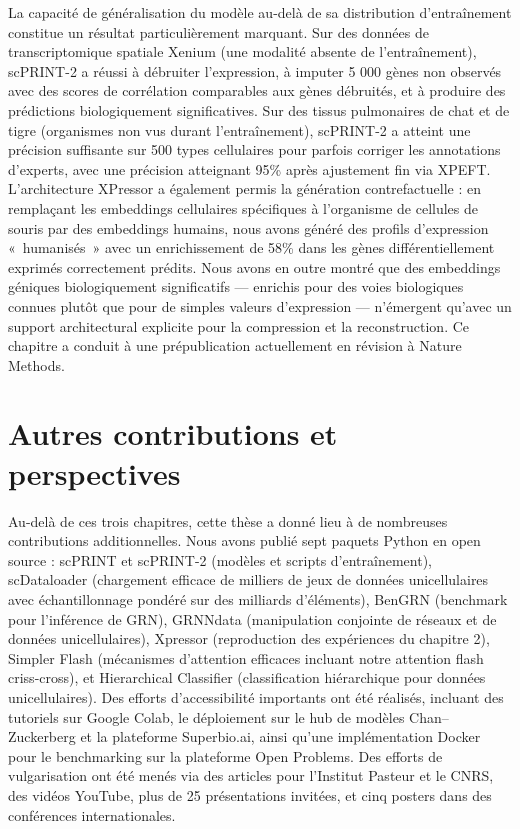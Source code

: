 La capacité de généralisation du modèle au-delà de sa distribution d'entraînement constitue un résultat particulièrement marquant. Sur des données de transcriptomique spatiale Xenium (une modalité absente de l'entraînement), scPRINT-2 a réussi à débruiter l'expression, à imputer 5 000 gènes non observés avec des scores de corrélation comparables aux gènes débruités, et à produire des prédictions biologiquement significatives. Sur des tissus pulmonaires de chat et de tigre (organismes non vus durant l'entraînement), scPRINT-2 a atteint une précision suffisante sur 500 types cellulaires pour parfois corriger les annotations d'experts, avec une précision atteignant 95\% après ajustement fin via XPEFT. L'architecture XPressor a également permis la génération contrefactuelle : en remplaçant les embeddings cellulaires spécifiques à l'organisme de cellules de souris par des embeddings humains, nous avons généré des profils d'expression «~humanisés~» avec un enrichissement de 58\% dans les gènes différentiellement exprimés correctement prédits. Nous avons en outre montré que des embeddings géniques biologiquement significatifs — enrichis pour des voies biologiques connues plutôt que pour de simples valeurs d'expression — n'émergent qu'avec un support architectural explicite pour la compression et la reconstruction. Ce chapitre a conduit à une prépublication actuellement en révision à Nature Methods.

\section*{Autres contributions et perspectives}

Au-delà de ces trois chapitres, cette thèse a donné lieu à de nombreuses contributions additionnelles. Nous avons publié sept paquets Python en open source : scPRINT et scPRINT-2 (modèles et scripts d'entraînement), scDataloader (chargement efficace de milliers de jeux de données unicellulaires avec échantillonnage pondéré sur des milliards d'éléments), BenGRN (benchmark pour l'inférence de GRN), GRNNdata (manipulation conjointe de réseaux et de données unicellulaires), Xpressor (reproduction des expériences du chapitre 2), Simpler Flash (mécanismes d'attention efficaces incluant notre attention flash criss-cross), et Hierarchical Classifier (classification hiérarchique pour données unicellulaires). Des efforts d'accessibilité importants ont été réalisés, incluant des tutoriels sur Google Colab, le déploiement sur le hub de modèles Chan–Zuckerberg et la plateforme Superbio.ai, ainsi qu'une implémentation Docker pour le benchmarking sur la plateforme Open Problems. Des efforts de vulgarisation ont été menés via des articles pour l'Institut Pasteur et le CNRS, des vidéos YouTube, plus de 25 présentations invitées, et cinq posters dans des conférences internationales.


